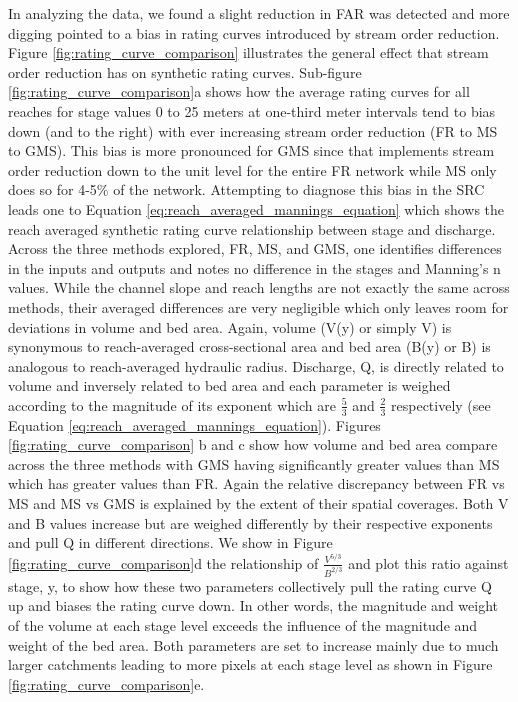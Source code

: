 \documentclass[draft]{dependencies/agujournal2019}
\begin{document}
In analyzing the data, we found a slight reduction in FAR was detected and more digging pointed to a bias in rating curves introduced by stream order reduction.
Figure \ref{fig:rating_curve_comparison} illustrates the general effect that stream order reduction has on synthetic rating curves.
Sub-figure \ref{fig:rating_curve_comparison}a shows how the average rating curves for all reaches for stage values 0 to 25 meters at one-third meter intervals tend to bias down (and to the right) with ever increasing stream order reduction (FR to MS to GMS). 
This bias is more pronounced for GMS since that implements stream order reduction down to the unit level for the entire FR network while MS only does so for 4-5\% of the network.
Attempting to diagnose this bias in the SRC leads one to Equation \ref{eq:reach_averaged_mannings_equation} which shows the reach averaged synthetic rating curve relationship between stage and discharge.
Across the three methods explored, FR, MS, and GMS, one identifies differences in the inputs and outputs and notes no difference in the stages and Manning's n values.
While the channel slope and reach lengths are not exactly the same across methods, their averaged differences are very negligible which only leaves room for deviations in volume and bed area.
Again, volume (V(y) or simply V) is synonymous to reach-averaged cross-sectional area and bed area (B(y) or B) is analogous to reach-averaged hydraulic radius.
Discharge, Q, is directly related to volume and inversely related to bed area and each parameter is weighed according to the magnitude of its exponent which are $\frac{5}{3}$ and $\frac{2}{3}$ respectively (see Equation \ref{eq:reach_averaged_mannings_equation}). 
Figures \ref{fig:rating_curve_comparison} b and c show how volume and bed area compare across the three methods with GMS having significantly greater values than MS which has greater values than FR.
Again the relative discrepancy between FR vs MS and MS vs GMS is explained by the extent of their spatial coverages.
Both V and B values increase but are weighed differently by their respective exponents and pull Q in different directions.
We show in Figure \ref{fig:rating_curve_comparison}d the relationship of $\frac{V^{5/3}}{B^{2/3}}$ and plot this ratio against stage, y, to show how these two parameters collectively pull the rating curve Q up and biases the rating curve down.
In other words, the magnitude and weight of the volume at each stage level exceeds the influence of the magnitude and weight of the bed area.
Both parameters are set to increase mainly due to much larger catchments leading to more pixels at each stage level as shown in Figure \ref{fig:rating_curve_comparison}e.
\end{document}
